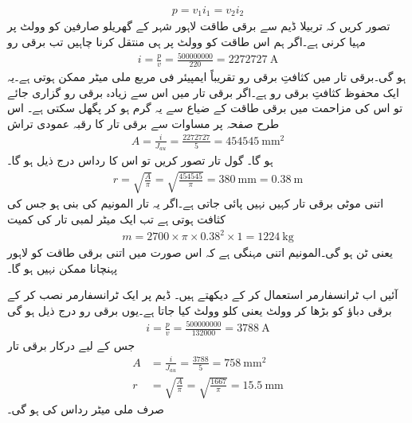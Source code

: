 %
\begin{align*}
p=v_1 i_1 = v_2 i_2
\end{align*}
تصور کریں کہ تربیلا ڈیم  سے   برقی طاقت  لاہور شہر کے گھریلو صارفین کو   وولٹ پر مہیا کرنی ہے۔اگر ہم اس طاقت کو   وولٹ پر ہی منتقل کرنا چاہیں تب برقی رو
\begin{align*}
i=\frac{p}{v}=\frac{\num{500000000}}{220}=\SI{2272727}{\ampere}
\end{align*}
ہو گی۔برقی تار میں کثافتِ برقی رو  تقریباً  ایمپیئر فی مربع ملی میٹر   ممکن ہوتی ہے۔یہ ایک محفوظ کثافتِ برقی رو ہے۔اگر برقی تار میں اس سے زیادہ برقی رو گزاری جائے تو اس کی مزاحمت میں برقی طاقت کے ضیاع سے یہ گرم ہو کر پگھل سکتی ہے۔ اس طرح صفحہ  پر  مساوات  سے برقی تار کا رقبہ عمودی تراش
\begin{align*}
A=\frac{i}{J_{au}}=\frac{\num{2272727}}{5}=\SI{454545}{\milli\meter\squared}
\end{align*}
ہو گا۔ گول تار تصور کریں تو اس کا رداس درج ذیل ہو گا۔
\begin{align*}
r=\sqrt{\frac{A}{\pi}}=\sqrt{\frac{\num{454545}}{\pi}}=\SI{380}{\milli\meter}=\SI{0.38}{\meter}
\end{align*}
اتنی موٹی برقی تار کہیں نہیں پائی جاتی ہے۔اگر یہ تار المونیم کی بنی ہو جس کی  کثافت   ہوتی ہے تب ایک میٹر لمبی تار کی کمیت
\begin{align*}
m=2700 \times \pi \times 0.38^2 \times 1=\SI{1224}{\kilo\gram}
\end{align*}
یعنی  ٹن ہو گی۔المونیم اتنی مہنگی ہے کہ اس صورت میں اتنی برقی طاقت کو لاہور پہنچانا ممکن نہیں ہو گا۔

آئیں اب ٹرانسفارمر استعمال کر کے دیکھتے ہیں۔ ڈیم پر ایک ٹرانسفارمر نصب کر کے برقی دباؤ کو بڑھا کر   وولٹ یعنی  کلو وولٹ  کیا جاتا ہے۔یوں برقی رو درج ذیل ہو گی
\begin{align*}
i=\frac{p}{v}=\frac{\num{500000000}}{\num{132000}}=\SI{3788}{\ampere}
\end{align*}
جس کے لیے درکار برقی تار
\begin{align*}
A&=\frac{i}{J_{au}}=\frac{\num{3788}}{5}=\SI{758}{\milli\meter\squared}\\
r&=\sqrt{\frac{A}{\pi}}=\sqrt{\frac{1667}{\pi}}=\SI{15.5}{\milli\meter}
\end{align*}
صرف  ملی میٹر رداس کی ہو گی۔ 
%

